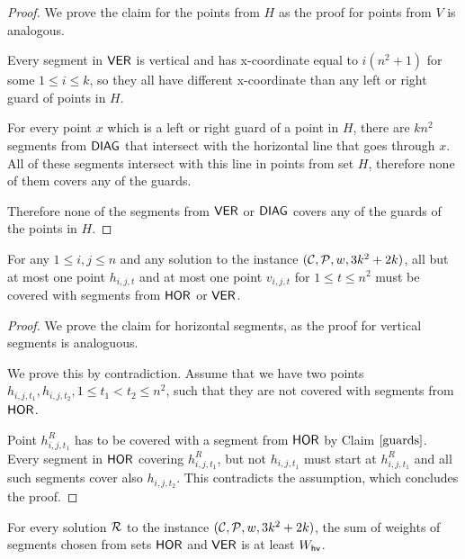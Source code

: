 \begin{proof}
We prove the claim for the points from $H$
as the proof for points from $V$ is analogous.

Every segment in $\mathsf{VER}$ is vertical and 
has x-coordinate equal to $i(n^2+1)$ for some $1\le i \le k$,
so they all have different x-coordinate
than any left or right guard of points in $H$.

For every point $x$ which is a left or right guard of a point in $H$,
there are $kn^2$ segments from $\mathsf{DIAG}$ that intersect with the horizontal
line that goes through $x$. All of these segments intersect with
this line in points from set $H$, therefore none of them
covers any of the guards.

Therefore none of the segments from $\mathsf{VER}$ or $\mathsf{DIAG}$ covers any
of the guards of the points in $H$.
\end{proof}

\begin{claim}
\label{one_diag_in_square}
For any $1 \le i, j \le n$
and any solution to the instance $(\mathcal{C}, \mathcal{P}, w, 3k^2+2k)$,
all but at most one point $h_{i, j, t}$
and at most one point $v_{i, j, t}$
for $1 \le t \le n^2$
must be
covered with segments from $\mathsf{HOR}$ or $\mathsf{VER}$.
\end{claim}

\begin{proof}
We prove the claim for horizontal segments,
as the proof for vertical segments is analoguous.

We prove this by contradiction. Assume that we
have two points $h_{i,j,t_1}, h_{i,j,t_2},1 \le t_1 <  t_2 \le n^2$,
such that they are not covered with segments from $\mathsf{HOR}$.

Point $h^R_{i, j, t_1}$ has to be covered with a segment from $\mathsf{HOR}$
by Claim $\ref{guards}$.
Every segment in $\mathsf{HOR}$ covering $h^R_{i, j, t_1}$,
but not $h_{i,j,t_1}$ must start at $h^R_{i, j, t_1}$
and all such segments cover also $h_{i, j, t_2}$.
This contradicts the assumption, which concludes the proof.
\end{proof}

\begin{lemma}
\label{vertical_horizontal_sum}
For every solution $\mathcal{R}$ to the instance $(\mathcal{C}, \mathcal{P}, w, 3k^2+2k)$,
the sum of weights of segments chosen
from sets $\mathsf{HOR}$ and $\mathsf{VER}$ is at least
$W_{\mathsf{hv}}$.
\end{lemma}


